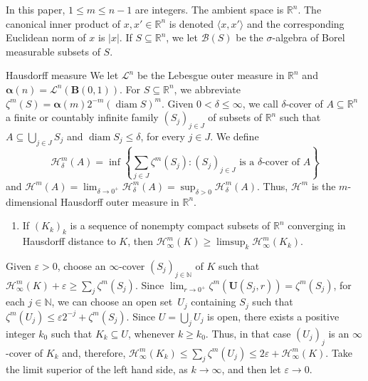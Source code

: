 \documentclass[JEP,XML,SOM,Unicode,ThmDefs,NoEqCountersInSection]{cedram}
\newenvironment{Empty}[2][\null]{%
\begin{enonce}[remark]{#1}#2}
{\end{enonce}}
\newcommand{\N}{\mathbb{N}}
\newcommand{\R}{\mathbb{R}}
\newcommand{\Rn}{\R^n}
\newcommand{\calB}{\mathscr{B}}
\newcommand{\calH}{\mathscr{H}}
\newcommand{\calL}{\mathscr{L}}
\newcommand{\balpha}{\boldsymbol{\alpha}}
\newcommand{\bB}{{\boldsymbol{B}}}
\newcommand{\bU}{{\boldsymbol{U}}}
\DeclareMathOperator{\rmdiam}{\mathrm{diam}}
\let\veps\varepsilon
\let\la\langle
\let\ra\rangle
\let\subset\subseteq
\begin{document}
\begin{Empty}[]
In this paper, $1 \leq m \leq n-1$ are integers.
The ambient space is $\Rn$.
The canonical inner product of $x,x' \in \Rn$ is denoted $\la x,x' \ra$ and the corresponding Euclidean norm of $x$ is $|x|$.
If $S \subset \Rn$, we let $\calB(S)$ be the $\sigma$-algebra of Borel measurable subsets of $S$.
\end{Empty}

\begin{Empty}[Hausdorff measure]
\label{h.m}
We let $\calL^n$ be the Lebesgue outer measure in $\Rn$ and $\balpha(n) = \calL^n(\bB(0,1))$.
For $S \subset \Rn$, we abbreviate $\zeta^m(S) = \balpha(m) 2^{-m}(\rmdiam S)^m$.
Given $0 < \delta \leq \infty$, we call $\delta$-cover of $A \subset \Rn$ a finite or countably infinite family $(S_j)_{j \in J}$ of subsets of $\Rn$ such that $A \subset \bigcup_{j \in J} S_j$ and $\rmdiam S_j \leq \delta$, for every $j \in J$.
We define
\begin{equation*}\textstyle
\calH^m_\delta(A) = \inf \left\{ \sum_{j \in J} \zeta^m(S_j): (S_j)_{j \in J} \text{ is a $\delta$-cover of $A$}\right\}
\end{equation*}
and $\calH^m(A) = \lim_{\delta \to 0^+} \calH^m_\delta(A) = \sup_{\delta > 0} \calH^m_\delta(A)$.
Thus, $\calH^m$ is the $m$-dimensional Hausdorff outer measure in $\Rn$.
\par
{\it
\begin{enumerate}
\item\label{enum:2.1} If $(K_k)_k$ is a sequence of nonempty compact subsets of $\Rn$ converging in Hausdorff distance to $K$, then $\calH^m_\infty(K) \geq \limsup_k \calH^m_\infty(K_k)$.
\end{enumerate}
}
\par
Given $\veps > 0$, choose an $\infty$-cover $(S_j)_{j \in \N}$ of $K$ such that $\calH^m_\infty(K) + \veps \geq \sum_j \zeta^m(S_j)$.
Since $\lim_{r \to 0^+} \zeta^m(\bU(S_j,r))=\zeta^m(S_j)$, for each $j \in \N$, we can choose an open set~$U_j$ containing $S_j$ such that $\zeta^m(U_j) \leq \veps 2^{-j} + \zeta^m(S_j)$.
Since $U = \bigcup_j U_j$ is open, there exists a positive integer $k_0$ such that $K_k \subset U$, whenever $k \geq k_0$.
Thus, in that case $(U_j)_j$ is an $\infty$-cover of $K_k$ and, therefore, $\calH^m_\infty(K_k) \leq \sum_j \zeta^m(U_j) \leq 2\veps + \calH^m_\infty(K)$.
Take the limit superior of the left hand side, as $k \to \infty$, and then let $\veps \to 0$.
\par
{\it
\begin{enumerate}

\end{enumerate}}
\end{Empty}
\end{document}
